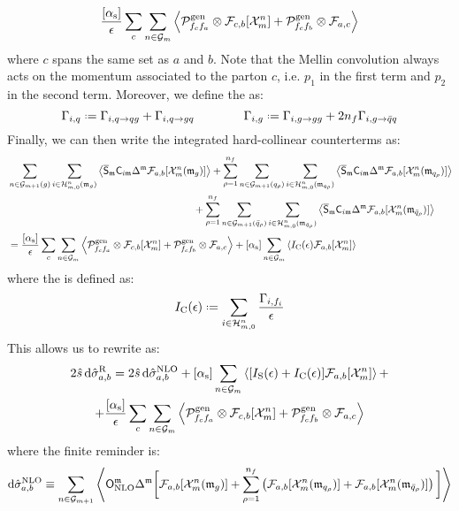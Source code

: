\begin{equation*}
  \frac{[\alpha_\text{s}]}{\epsilon} \sum_c \sum_{n \in \mathcal{G}_m} \left\langle \mathcal{P}^\text{gen}_{f_c f_a} \otimes \mathcal{F}_{c,b}[\mathcal{X}^{n}_{m}] + \mathcal{P}^\text{gen}_{f_c f_b} \otimes \mathcal{F}_{a,c} \right\rangle
\end{equation*}
where $ c $ spans the same set as $ a $ and $ b $. Note that the Mellin convolution always acts on the momentum associated to the parton $ c $, i.e. $ p_1 $ in the first term and $ p_2 $ in the second term. Moreover, we define the  as:
\begin{equation}
  \Gamma_{i,q} \defeq \Gamma_{i , q \rightarrow q g} + \Gamma_{i , q \rightarrow g q}
  \qquad \qquad
  \Gamma_{i,g} \defeq \Gamma_{i , g \rightarrow g g} + 2n_f \Gamma_{i , g \rightarrow \bar{q} q}
  \label{eq:fin-gen-an-dim}
\end{equation}
Finally, we can then write the integrated hard-collinear counterterms as:
\begin{equation*}
  \begin{split}
    & \sum_{n \in \mathcal{G}_{m+1}(g)} \sum_{i \in \mathcal{H}^{n}_{m,0}(\mathfrak{m}_g)} \left\langle \overline{\mathsf{S}}_{\mathfrak{m}} \mathsf{C}_{i\mathfrak{m}} \Delta^{\mathfrak{m}} \mathcal{F}_{a,b}[\mathcal{X}^{n}_{m}(\mathfrak{m}_g)] \right\rangle + \sum_{\rho = 1}^{n_f} \sum_{n \in \mathcal{G}_{m+1}(q_\rho)} \sum_{i \in \mathcal{H}^{n}_{m,0}(\mathfrak{m}_{q_\rho})} \left\langle \overline{\mathsf{S}}_{\mathfrak{m}} \mathsf{C}_{i\mathfrak{m}} \Delta^{\mathfrak{m}} \mathcal{F}_{a,b}[\mathcal{X}^{n}_{m}(\mathfrak{m}_{q_\rho})] \right\rangle \\
    & \qquad \qquad \qquad \qquad \qquad \qquad \qquad \qquad \qquad \,\, + \sum_{\rho = 1}^{n_f} \sum_{n \in \mathcal{G}_{m+1}(\bar{q}_\rho)} \sum_{i \in \mathcal{H}^{n}_{m,0}(\mathfrak{m}_{\bar{q}_\rho})} \left\langle \overline{\mathsf{S}}_{\mathfrak{m}} \mathsf{C}_{i\mathfrak{m}} \Delta^{\mathfrak{m}} \mathcal{F}_{a,b}[\mathcal{X}^{n}_{m}(\mathfrak{m}_{\bar{q}_\rho})] \right\rangle \\
    & = \frac{[\alpha_\text{s}]}{\epsilon} \sum_c \sum_{n \in \mathcal{G}_m} \left\langle \mathcal{P}^\text{gen}_{f_c f_a} \otimes \mathcal{F}_{c,b}[\mathcal{X}^{n}_{m}] + \mathcal{P}^\text{gen}_{f_c f_b} \otimes \mathcal{F}_{a,c} \right\rangle + [\alpha_\text{s}] \sum_{n \in \mathcal{G}_m} \left\langle I_\text{C}(\epsilon) \mathcal{F}_{a,b}[\mathcal{X}^{n}_{m}] \right\rangle
  \end{split}
\end{equation*}
where the  is defined as:
\begin{equation}
  \ico(\de) \defeq \sum_{i \in \prt{n}{m}} \frac{\Gamma_{i,f_i}}{\de}
\end{equation}
This allows us to rewrite  as:
\begin{multline}
  2\hat{s}\, \mathrm{d}\hat{\sigma}_{a,b}^\text{R} = 2\hat{s}\, \mathrm{d}\hat{\sigma}_{a,b}^\text{NLO} + [\alpha_\text{s}] \sum_{n \in \mathcal{G}_m} \left\langle [I_\text{S}(\epsilon) + I_\text{C}(\epsilon)] \mathcal{F}_{a,b}[\mathcal{X}^{n}_{m}] \right\rangle + \\
  + \frac{[\alpha_\text{s}]}{\epsilon} \sum_c \sum_{n \in \mathcal{G}_m} \left\langle \mathcal{P}^\text{gen}_{f_c f_a} \otimes \mathcal{F}_{c,b}[\mathcal{X}^{n}_{m}] + \mathcal{P}^\text{gen}_{f_c f_b} \otimes \mathcal{F}_{a,c} \right\rangle
  \label{eq:real-fin}
\end{multline}
where the finite reminder is:
\begin{equation}
  \mathrm{d}\hat{\sigma}_{a,b}^\text{NLO} \equiv \sum_{n \in \mathcal{G}_{m+1}} \left\langle \mathsf{O}_\text{NLO}^{\mathfrak{m}} \Delta^{\mathfrak{m}} \bigg[ \mathcal{F}_{a,b}[\mathcal{X}^{n}_{m}(\mathfrak{m}_g)] + \sum_{\rho = 1}^{n_f} \left( \mathcal{F}_{a,b}[\mathcal{X}^{n}_{m}(\mathfrak{m}_{q_\rho})] + \mathcal{F}_{a,b}[\mathcal{X}^{n}_{m}(\mathfrak{m}_{\bar{q}_\rho})] \right) \bigg] \right\rangle
\end{equation}

